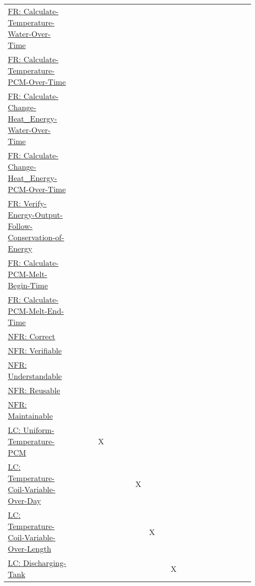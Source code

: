 \documentclass[12pt]{article}
\begin{document}
\begin{longtable}{l l l l l l l l l l l l l l l l l l l l l}
\\
\hyperref[calcTempWtrOverTime]{FR: Calculate-Temperature-Water-Over-Time} &  &  &  &  &  &  &  &  &  &  &  &  &  &  &  &  &  &  &  & 
\\
\hyperref[calcTempPCMOverTime]{FR: Calculate-Temperature-PCM-Over-Time} &  &  &  &  &  &  &  &  &  &  &  &  &  &  &  &  &  &  &  & 
\\
\hyperref[calcChgHeatEnergyWtrOverTime]{FR: Calculate-Change-Heat\_Energy-Water-Over-Time} &  &  &  &  &  &  &  &  &  &  &  &  &  &  &  &  &  &  &  & 
\\
\hyperref[calcChgHeatEnergyPCMOverTime]{FR: Calculate-Change-Heat\_Energy-PCM-Over-Time} &  &  &  &  &  &  &  &  &  &  &  &  &  &  &  &  &  &  &  & 
\\
\hyperref[verifyEnergyOutput]{FR: Verify-Energy-Output-Follow-Conservation-of-Energy} &  &  &  &  &  &  &  &  &  &  &  &  &  &  &  &  &  &  &  & 
\\
\hyperref[calcPCMMeltBegin]{FR: Calculate-PCM-Melt-Begin-Time} &  &  &  &  &  &  &  &  &  &  &  &  &  &  &  &  &  &  &  & 
\\
\hyperref[calcPCMMeltEnd]{FR: Calculate-PCM-Melt-End-Time} &  &  &  &  &  &  &  &  &  &  &  &  &  &  &  &  &  &  &  & 
\\
\hyperref[correct]{NFR: Correct} &  &  &  &  &  &  &  &  &  &  &  &  &  &  &  &  &  &  &  & 
\\
\hyperref[verifiable]{NFR: Verifiable} &  &  &  &  &  &  &  &  &  &  &  &  &  &  &  &  &  &  &  & 
\\
\hyperref[understandable]{NFR: Understandable} &  &  &  &  &  &  &  &  &  &  &  &  &  &  &  &  &  &  &  & 
\\
\hyperref[reusable]{NFR: Reusable} &  &  &  &  &  &  &  &  &  &  &  &  &  &  &  &  &  &  &  & 
\\
\hyperref[maintainable]{NFR: Maintainable} &  &  &  &  &  &  &  &  &  &  &  &  &  &  &  &  &  &  &  & 
\\
\hyperref[likeChgUTP]{LC: Uniform-Temperature-PCM} &  &  &  & X &  &  &  &  &  &  &  &  &  &  &  &  &  &  &  & 
\\
\hyperref[likeChgTCVOD]{LC: Temperature-Coil-Variable-Over-Day} &  &  &  &  &  &  &  & X &  &  &  &  &  &  &  &  &  &  &  & 
\\
\hyperref[likeChgTCVOL]{LC: Temperature-Coil-Variable-Over-Length} &  &  &  &  &  &  &  &  & X &  &  &  &  &  &  &  &  &  &  & 
\\
\hyperref[likeChgDT]{LC: Discharging-Tank} &  &  &  &  &  &  &  &  &  &  & X &  &  &  &  &  &  &  &  & 

\end{longtable}
\end{document}
